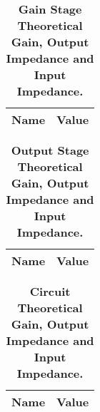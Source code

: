 \begin{table}[H]
\centering
\begin{tabular}{|l|l|}
\hline
{\bf Name} & {\bf Value} \\ \hline
    
\end{tabular}
\caption{\textbf{Gain Stage Theoretical Gain, Output Impedance and Input Impedance.}}
\end{table}

\begin{table}[H]
\centering
\begin{tabular}{|l|l|}
\hline
{\bf Name} & {\bf Value} \\ \hline
    
\end{tabular}
\caption{\textbf{Output Stage Theoretical Gain, Output Impedance and Input Impedance.}}
\end{table}

\begin{table}[H]
\centering
\begin{tabular}{|l|l|}
\hline
{\bf Name} & {\bf Value} \\ \hline
    
\end{tabular}
\caption{\textbf{Circuit Theoretical Gain, Output Impedance and Input Impedance.}}
\end{table}
